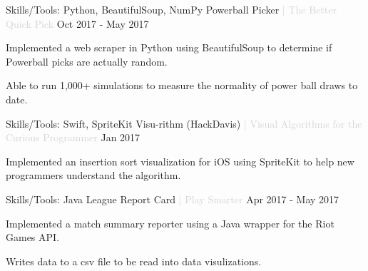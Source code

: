 

\begin{cventries}

  \cventry
    {Skills/Tools: Python, BeautifulSoup, NumPy} %
    {Powerball Picker \textcolor{lightgray}{| The Better Quick Pick}} %
    {} %
    {Oct 2017 - May 2017} %
    {
      \begin{cvitems} %
        \item {Implemented a web scraper in Python using BeautifulSoup to determine if Powerball picks are actually random.}
        \item {Able to run 1,000+ simulations to measure the normality of power ball draws to date.}
      \end{cvitems}
    }

  \cventry
    {Skills/Tools: Swift, SpriteKit} %
    {Visu-rithm (HackDavis) \textcolor{lightgray}{| Visual Algorithms for the Curious Programmer}} %
    {} %
    {Jan 2017} %
    {
      \begin{cvitems} %
        \item {Implemented an insertion sort visualization for iOS using SpriteKit to help new programmers understand the algorithm.}
      \end{cvitems}
  }

  \cventry
    {Skills/Tools: Java} %
    {League Report Card \textcolor{lightgray}{| Play Smarter}} %
    {} %
    {Apr 2017 - May 2017} %
    {
      \begin{cvitems} %
        \item {Implemented a match summary reporter using a Java wrapper for the Riot Games API.}
        \item {Writes data to a csv file to be read into data visulizations.}
      \end{cvitems}
  }

\end{cventries}
